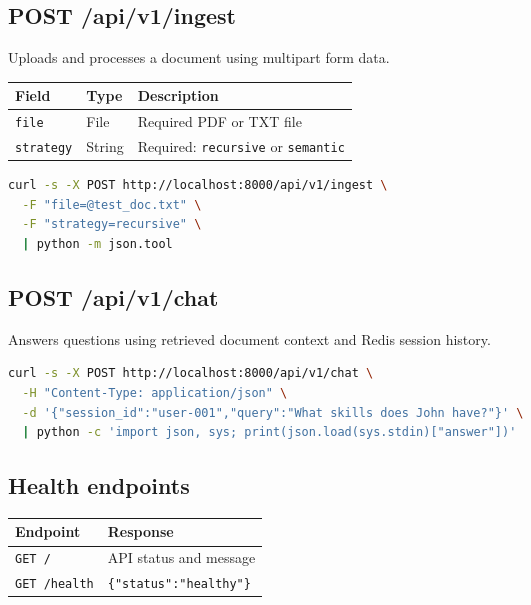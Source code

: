 \documentclass[12pt, a4paper]{article}
\begin{document}
\subsection{POST /api/v1/ingest}

Uploads and processes a document using multipart form data.

\begin{tabularx}{\textwidth}{L{2.5cm} L{2.5cm} Y}
    \toprule
    \textbf{Field} & \textbf{Type} & \textbf{Description} \\
    \midrule
    \texttt{file} & File & Required PDF or TXT file \\
    \texttt{strategy} & String & Required: \texttt{recursive} or
    \texttt{semantic} \\
    \bottomrule
\end{tabularx}

\begin{lstlisting}[language=bash]
curl -s -X POST http://localhost:8000/api/v1/ingest \
  -F "file=@test_doc.txt" \
  -F "strategy=recursive" \
  | python -m json.tool
\end{lstlisting}

\subsection{POST /api/v1/chat}

Answers questions using retrieved document context and Redis session history.

\begin{lstlisting}[language=bash]
curl -s -X POST http://localhost:8000/api/v1/chat \
  -H "Content-Type: application/json" \
  -d '{"session_id":"user-001","query":"What skills does John have?"}' \
  | python -c 'import json, sys; print(json.load(sys.stdin)["answer"])'
\end{lstlisting}

\subsection{Health endpoints}

\begin{tabularx}{\textwidth}{L{3.5cm} Y}
    \toprule
    \textbf{Endpoint} & \textbf{Response} \\
    \midrule
    \texttt{GET /} & API status and message \\
    \texttt{GET /health} & \texttt{\{"status":"healthy"\}} \\
    \bottomrule
\end{tabularx}
\end{document}
